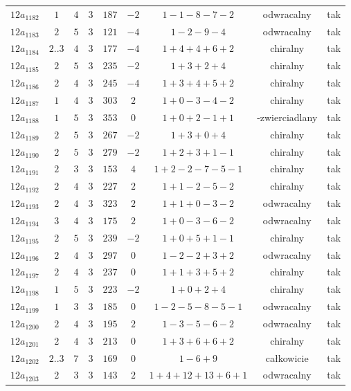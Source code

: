 \begin{longtable}{ccccccccc}
$12a_{1182}$ & $1$ & $4$ & $3$ & $187$ & $-2$ & $1-1-8-7-2$ & odwracalny & tak \\
$12a_{1183}$ & $2$ & $5$ & $3$ & $121$ & $-4$ & $1-2-9-4$ & odwracalny & tak \\
$12a_{1184}$ & $2..3$ & $4$ & $3$ & $177$ & $-4$ & $1+4+4+6+2$ & chiralny & tak \\
$12a_{1185}$ & $2$ & $5$ & $3$ & $235$ & $-2$ & $1+3+2+4$ & chiralny & tak \\
$12a_{1186}$ & $2$ & $4$ & $3$ & $245$ & $-4$ & $1+3+4+5+2$ & chiralny & tak \\
$12a_{1187}$ & $1$ & $4$ & $3$ & $303$ & $2$ & $1+0-3-4-2$ & chiralny & tak \\
$12a_{1188}$ & $1$ & $5$ & $3$ & $353$ & $0$ & $1+0+2-1+1$ & -zwierciadlany & tak \\
$12a_{1189}$ & $2$ & $5$ & $3$ & $267$ & $-2$ & $1+3+0+4$ & chiralny & tak \\
$12a_{1190}$ & $2$ & $5$ & $3$ & $279$ & $-2$ & $1+2+3+1-1$ & chiralny & tak \\
$12a_{1191}$ & $2$ & $3$ & $3$ & $153$ & $4$ & $1+2-2-7-5-1$ & chiralny & tak \\
$12a_{1192}$ & $2$ & $4$ & $3$ & $227$ & $2$ & $1+1-2-5-2$ & chiralny & tak \\
$12a_{1193}$ & $2$ & $4$ & $3$ & $323$ & $2$ & $1+1+0-3-2$ & odwracalny & tak \\
$12a_{1194}$ & $3$ & $4$ & $3$ & $175$ & $2$ & $1+0-3-6-2$ & odwracalny & tak \\
$12a_{1195}$ & $2$ & $5$ & $3$ & $239$ & $-2$ & $1+0+5+1-1$ & chiralny & tak \\
$12a_{1196}$ & $2$ & $4$ & $3$ & $297$ & $0$ & $1-2-2+3+2$ & odwracalny & tak \\
$12a_{1197}$ & $2$ & $4$ & $3$ & $237$ & $0$ & $1+1+3+5+2$ & chiralny & tak \\
$12a_{1198}$ & $1$ & $5$ & $3$ & $223$ & $-2$ & $1+0+2+4$ & chiralny & tak \\
$12a_{1199}$ & $1$ & $3$ & $3$ & $185$ & $0$ & $1-2-5-8-5-1$ & odwracalny & tak \\
$12a_{1200}$ & $2$ & $4$ & $3$ & $195$ & $2$ & $1-3-5-6-2$ & odwracalny & tak \\
$12a_{1201}$ & $2$ & $4$ & $3$ & $213$ & $0$ & $1+3+6+6+2$ & chiralny & tak \\
$12a_{1202}$ & $2..3$ & $7$ & $3$ & $169$ & $0$ & $1-6+9$ & całkowicie & tak \\
$12a_{1203}$ & $2$ & $3$ & $3$ & $143$ & $2$ & $1+4+12+13+6+1$ & odwracalny & tak \\

\end{longtable}
